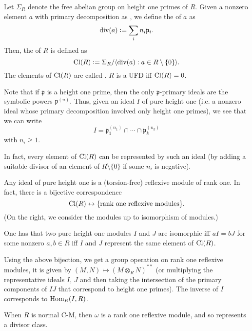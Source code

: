 \documentclass[12pt]{article}
\begin{document}
Let $\Sigma_{R}$ denote the free abelian group on height one primes of $R$. Given a nonzero element $a$ with primary decomposition as , we define the  of $a$ as 
\begin{equation*} 
	\div(a) \vcentcolon= \sum_{i} n_{i} \mathfrak{p}_{i}.
\end{equation*} 
Then, the  of $R$ is defined as
\begin{equation*} 
	\Cl(R) \vcentcolon= \Sigma_{R}/\langle \div(a) : a \in R \setminus \{0\} \rangle.
\end{equation*}
The elements of $\Cl(R)$ are called . $R$ is a UFD iff $\Cl(R) = 0$.

Note that if $\mathfrak{p}$ is a height one prime, then the only $\mathfrak{p}$-primary ideals are the symbolic powers $\mathfrak{p}^{(n)}$. Thus, given an ideal $I$ of pure height one (i.e. a nonzero ideal whose primary decomposition involved only height one primes), we see that we can write
\begin{equation*} 
	I = \mathfrak{p}_{1}^{(n_{1})} \cap \cdots \cap \mathfrak{p}_{k}^{(n_{k})}
\end{equation*}
with $n_{i} \ge 1$. 

In fact, every element of $\Cl(R)$ can be represented by such an ideal (by adding a suitable divisor of an element of $R \setminus \{0\}$ if some $n_{i}$ is negative).

Any ideal of pure height one is a (torsion-free) reflexive module of rank one. In fact, there is a bijective correspondence
\begin{equation*} 
	\Cl(R) \leftrightarrow \{\text{rank one reflexive modules}\}.
\end{equation*}
(On the right, we consider the modules up to isomorphism of modules.)

One has that two pure height one modules $I$ and $J$ are isomorphic iff $aI = bJ$ for some nonzero $a, b \in R$ iff $I$ and $J$ represent the same element of $\Cl(R)$. 

Using the above bijection, we get a group operation on rank one reflexive modules, it is given by $(M, N) \mapsto (M \otimes_{R} N)^{\ast \ast}$ (or multiplying the representative ideals $I$, $J$ and then taking the intersection of the primary components of $IJ$ that correspond to height one primes). \newline
The inverse of $I$ corresponds to $\Hom_{R}(I, R)$. 

When $R$ is normal C-M, then $\omega$ is a rank one reflexive module, and so represents a divisor class.
\end{document}
